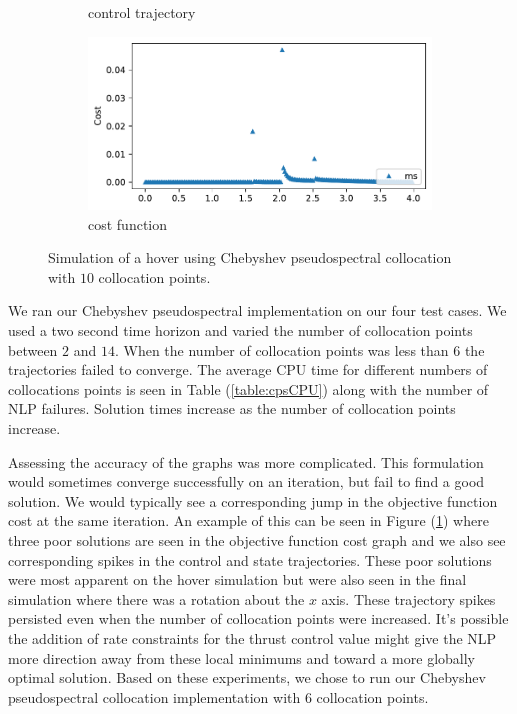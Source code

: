\documentclass[]{article}
\begin{document}
\begin{figure}[H]
\begin{subfigure}[b]{0.3\textwidth}
		\caption{control trajectory}
	\end{subfigure}%
	\begin{subfigure}[b]{0.3\textwidth}
		\centering
		\includegraphics[width=\textwidth]{figures/cpsCost.pdf}
		\caption{cost function}
	\end{subfigure}
	\caption{Simulation of a hover using Chebyshev pseudospectral collocation with $10$ collocation points.}
	\label{fig:cps10}
\end{figure}
	
	We ran our Chebyshev pseudospectral implementation on our four test cases. We used a two second time horizon and varied the number of collocation points between $2$ and $14$.  When the number of collocation points was less than $6$ the trajectories failed to converge. The average CPU time for different numbers of collocations points is seen in Table (\ref{table:cpsCPU}) along with the number of NLP failures.	Solution times increase as the number of collocation points increase.  
	
	Assessing the accuracy of the graphs was more complicated.  This formulation would sometimes converge successfully on an iteration, but fail to find a good solution.  We would typically see a corresponding jump in the objective function cost at the same iteration. An example of this can be seen in Figure (\ref{fig:cps10}) where three poor solutions are seen in the objective function cost graph and we also see  corresponding spikes in the control and  state trajectories.  These poor solutions were most apparent on the hover simulation but were also seen in the final simulation where there was a rotation about the $x$ axis.  These trajectory spikes persisted even when the number of collocation points were increased.  It's possible the addition of rate constraints for the thrust control value might give the NLP more direction away from these local minimums and toward a more globally optimal solution. Based on these experiments, we chose to run our Chebyshev pseudospectral collocation implementation with $6$ collocation points.
	
\end{document}
